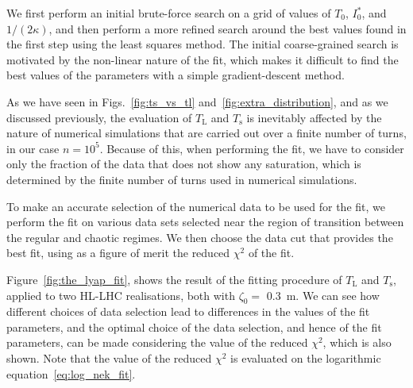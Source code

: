 We first perform an initial brute-force search on a grid of values of $T_0$, $I_0^*$, and $1/(2\kappa)$, and then perform a more refined search around the best values found in the first step using the least squares method. The initial coarse-grained search is motivated by the non-linear nature of the fit, which makes it difficult to find the best values of the parameters with a simple gradient-descent method.

As we have seen in Figs.~\ref{fig:ts_vs_tl} and~\ref{fig:extra_distribution}, and as we discussed previously, the evaluation of $T_\mathrm{L}$ and $T_\mathrm{s}$ is inevitably affected by the nature of numerical simulations that are carried out over a finite number of turns, in our case $n=10^5$. Because of this, when performing the fit, we have to consider only the fraction of the data that does not show any saturation, which is determined by the finite number of turns used in numerical simulations. 

To make an accurate selection of the numerical data to be used for the fit, we perform the fit on various data sets selected near the region of transition between the regular and chaotic regimes. We then choose the data cut that provides the best fit, using as a figure of merit the reduced $\chi^2$ of the fit.

Figure~\ref{fig:the_lyap_fit}, shows the result of the fitting procedure of $T_\mathrm{L}$ and $T_\mathrm{s}$, applied to two HL-LHC realisations, both with $\zeta_0=$ \SI{0.3}{\meter}. We can see how different choices of data selection lead to differences in the values of the fit parameters, and the optimal choice of the data selection, and hence of the fit parameters, can be made considering the value of the reduced $\chi^2$, which is also shown. Note that the value of the reduced $\chi^2$ is evaluated on the logarithmic equation~\eqref{eq:log_nek_fit}.

